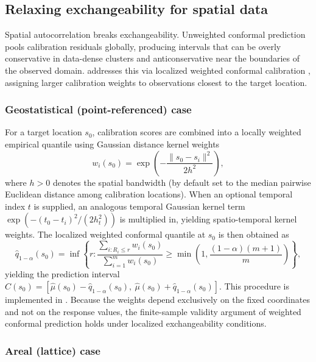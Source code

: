 \documentclass[article]{jss}
\begin{document}
\subsection{Relaxing exchangeability for spatial data}

Spatial autocorrelation breaks exchangeability. Unweighted conformal prediction pools calibration residuals globally, producing intervals that can be overly conservative in data-dense clusters and anticonservative near the boundaries of the observed domain.  addresses this via localized weighted conformal calibration \citep{Mao+Martin+Reich:2020, Tibshirani+al:2019}, assigning larger calibration weights to observations closest to the target location.

\subsubsection{Geostatistical (point-referenced) case}

For a target location $s_0$, calibration scores are combined into a locally weighted empirical quantile using Gaussian distance kernel weights
%
\begin{equation} \label{eq:weights}
w_i(s_0) = \exp\!\left(-\frac{\|s_0 - s_i\|^2}{2h^2}\right),
\end{equation}
%
where $h > 0$ denotes the spatial bandwidth (by default set to the median pairwise Euclidean distance among calibration locations). When an optional temporal index $t$ is supplied, an analogous temporal Gaussian kernel term $\exp(-(t_0-t_i)^2 / (2h_t^2))$ is multiplied in, yielding spatio-temporal kernel weights. The localized weighted conformal quantile at $s_0$ is then obtained as
%
\begin{equation} \label{eq:weighted_quantile}
\hat q_{1-\alpha}(s_0) = \inf\left\{ r : \frac{\sum_{i: R_i \le r} w_i(s_0)}{\sum_{i=1}^m w_i(s_0)} \geq \min\left(1, \frac{(1-\alpha)(m+1)}{m}\right) \right\},
\end{equation}
%
yielding the prediction interval $\hat{C}(s_0) = [\hat\mu(s_0) - \hat q_{1-\alpha}(s_0),\ \hat\mu(s_0) + \hat q_{1-\alpha}(s_0)]$. This procedure is implemented in . Because the weights depend exclusively on the fixed coordinates and not on the response values, the finite-sample validity argument of weighted conformal prediction \citep{Tibshirani+al:2019} holds under localized exchangeability conditions.

\subsubsection{Areal (lattice) case}
\end{document}
